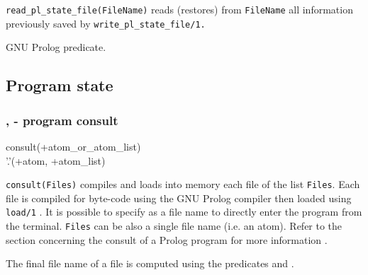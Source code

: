 \texttt{read\_pl\_state\_file(FileName)} reads (restores) from
\texttt{FileName} all information previously saved by
\texttt{write\_pl\_state\_file/1.}

\begin{PlErrors}




\end{PlErrors}

\Portability

GNU Prolog predicate.

\subsection{Program state}

\subsubsection{,\label{consult/1}
                - program consult}

\begin{TemplatesOneCol}
consult(+atom\_or\_atom\_list)\\
'.'(+atom, +atom\_list)

\end{TemplatesOneCol}

\Description

\texttt{consult(Files)} compiles and loads into memory each file
of the list \texttt{Files}. Each file is compiled for byte-code using the
GNU Prolog compiler  then loaded using
\texttt{load/1} . It is possible to specify  as a
file name to directly enter the program from the terminal. \texttt{Files} can
be also a single file name (i.e. an atom). Refer to the section concerning
the consult of a Prolog program for more information
.

The final file name of a file is computed using the predicates
  and
 .

